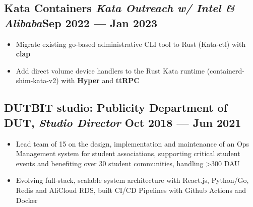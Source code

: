 \documentclass[a4,12pt]{article}
\newenvironment{zitemize}{
\begin{itemize}\itemsep0pt \parskip0pt \parsep1pt}
{\end{itemize}\vspace{-0.5cm}}
\begin{document}
\vspace{-0.2cm}

\subsection*{Kata Containers \normalfont\textit{Kata Outreach w/ Intel \& Alibaba}\hfill \textbf{Sep 2022 --- Jan 2023}} 
\begin{zitemize}
    \item Migrate existing go-based administrative CLI tool to Rust (Kata-ctl) with \textbf{clap}
    \item Add direct volume device handlers to the Rust Kata runtime (containerd-shim-kata-v2) with \textbf{Hyper} and \textbf{ttRPC}
\end{zitemize}


\vspace{-0.1cm}

\subsection*{DUTBIT studio: {\normalsize\normalfont Publicity Department of DUT, \textit{Studio Director}} \hfill  Oct 2018 --- Jun 2021} 

    \begin{zitemize}
        \item Lead team of 15 on the design, implementation and maintenance of an Ops Management system for student associations, supporting critical student events and benefiting over 30 student communities, handling >300 DAU
        \item Evolving full-stack, scalable system architecture with React.js, Python/Go, Redis and AliCloud RDS, built CI/CD Pipelines with Github Actions and Docker
    \end{zitemize}

\end{document}

